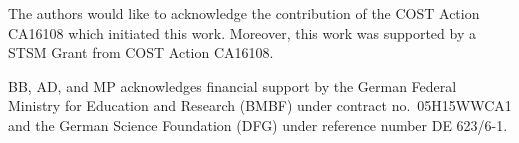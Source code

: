 The authors would like to acknowledge the contribution of the COST Action CA16108 which initiated this work.
Moreover, this work was supported by a STSM Grant from COST Action CA16108.

BB, AD, and MP acknowledges financial support by the
German Federal Ministry for Education and Research (BMBF) under
contract no.~05H15WWCA1 and the German Science Foundation (DFG) under
reference number DE 623/6-1.